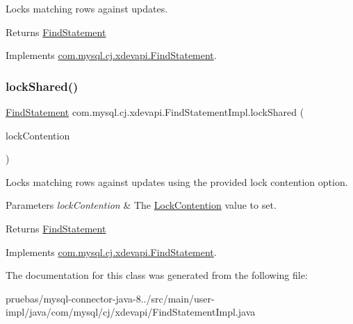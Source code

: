 Locks matching rows against updates.

\begin{DoxyReturn}{Returns}
\mbox{\hyperlink{interfacecom_1_1mysql_1_1cj_1_1xdevapi_1_1_find_statement}{Find\+Statement}} 
\end{DoxyReturn}


Implements \mbox{\hyperlink{interfacecom_1_1mysql_1_1cj_1_1xdevapi_1_1_find_statement_aaa2bf84ac564387d2909bf201aa57fc1}{com.\+mysql.\+cj.\+xdevapi.\+Find\+Statement}}.

\mbox{\label{classcom_1_1mysql_1_1cj_1_1xdevapi_1_1_find_statement_impl_aecf5ef40361b9b8646b416543c82d2d4}} 
\subsubsection{\texorpdfstring{lock\+Shared()}{lockShared()}\hspace{0.1cm}{\footnotesize\ttfamily [2/2]}}
{\footnotesize\ttfamily \mbox{\hyperlink{interfacecom_1_1mysql_1_1cj_1_1xdevapi_1_1_find_statement}{Find\+Statement}} com.\+mysql.\+cj.\+xdevapi.\+Find\+Statement\+Impl.\+lock\+Shared (\begin{DoxyParamCaption}\item[{Lock\+Contention}]{lock\+Contention }\end{DoxyParamCaption})}

Locks matching rows against updates using the provided lock contention option.


\begin{DoxyParams}{Parameters}
{\em lock\+Contention} & The \mbox{\hyperlink{}{Lock\+Contention}} value to set. \\
\hline
\end{DoxyParams}
\begin{DoxyReturn}{Returns}
\mbox{\hyperlink{interfacecom_1_1mysql_1_1cj_1_1xdevapi_1_1_find_statement}{Find\+Statement}} 
\end{DoxyReturn}


Implements \mbox{\hyperlink{interfacecom_1_1mysql_1_1cj_1_1xdevapi_1_1_find_statement_a462ecf53c1ba4a9d6e0d29a2a244bd62}{com.\+mysql.\+cj.\+xdevapi.\+Find\+Statement}}.



The documentation for this class was generated from the following file\+:\begin{DoxyCompactItemize}
\item 
pruebas/mysql-\/connector-\/java-\/8../src/main/user-\/impl/java/com/mysql/cj/xdevapi/Find\+Statement\+Impl.\+java\end{DoxyCompactItemize}
